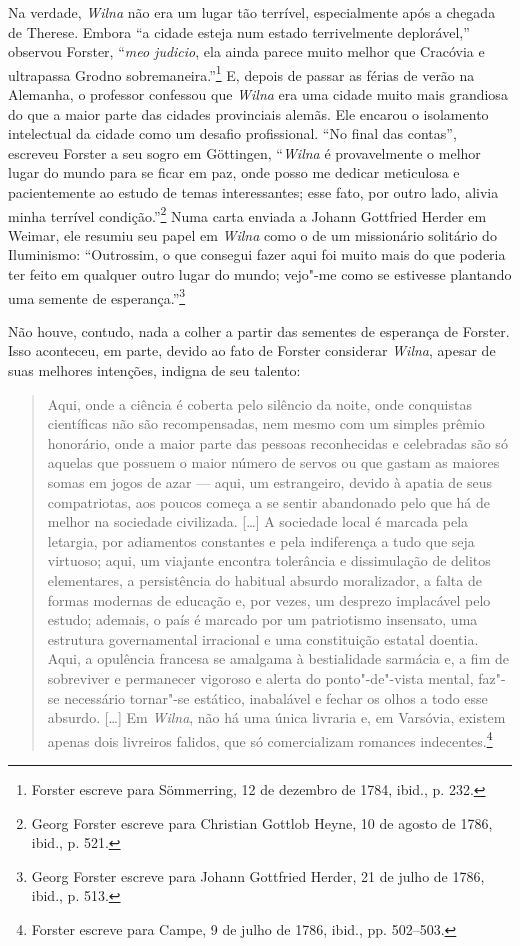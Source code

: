 Na verdade, \textit{Wilna} não era um lugar tão terrível, especialmente após a
chegada de Therese. Embora ``a cidade esteja num estado terrivelmente
deplorável,'' observou Forster, ``\textit{meo judicio}, ela ainda parece
muito melhor que Cracóvia e ultrapassa Grodno sobremaneira.''\footnote{Forster escreve para Sömmerring, 12 de dezembro de 1784, ibid., p. 232.} E, depois de passar as férias de verão na Alemanha, o professor confessou
que \textit{Wilna} era uma cidade muito mais grandiosa do que a maior parte das
cidades provinciais alemãs. Ele encarou o isolamento intelectual da
cidade como um desafio profissional. ``No final das contas'', escreveu
Forster a seu sogro em Göttingen, ``\textit{Wilna} é provavelmente o melhor lugar
do mundo para se ficar em paz, onde posso me dedicar meticulosa e
pacientemente ao estudo de temas interessantes; esse fato, por outro
lado, alivia minha terrível condição.''\footnote{Georg Forster escreve para Christian Gottlob Heyne, 10 de agosto de 1786, ibid., p. 521.} Numa carta enviada a Johann Gottfried Herder em Weimar, ele resumiu seu
papel em \textit{Wilna} como o de um missionário solitário do Iluminismo:
``Outrossim, o que consegui fazer aqui foi muito mais do que poderia ter
feito em qualquer outro lugar do mundo; vejo"-me como se estivesse
plantando uma semente de esperança.''\footnote{Georg Forster escreve para Johann Gottfried Herder, 21 de julho de 1786, ibid., p. 513.}

Não houve, contudo, nada a colher a partir das sementes de esperança de
Forster. Isso aconteceu, em parte, devido ao fato de Forster considerar
\textit{Wilna}, apesar de suas melhores intenções, indigna de seu talento:

\begin{quote}
Aqui, onde a ciência é coberta pelo silêncio da noite, onde conquistas
científicas não são recompensadas, nem mesmo com um simples prêmio
honorário, onde a maior parte das pessoas reconhecidas e celebradas são
só aquelas que possuem o maior número de servos ou que gastam as maiores
somas em jogos de azar --- aqui, um estrangeiro, devido à apatia de seus
compatriotas, aos poucos começa a se sentir abandonado pelo que há de
melhor na sociedade civilizada. [\ldots{}] A sociedade local é marcada
pela letargia, por adiamentos constantes e pela indiferença a tudo que
seja virtuoso; aqui, um viajante encontra tolerância e dissimulação de
delitos elementares, a persistência do habitual absurdo moralizador, a
falta de formas modernas de educação e, por vezes, um desprezo
implacável pelo estudo; ademais, o país é marcado por um patriotismo
insensato, uma estrutura governamental irracional e uma constituição
estatal doentia. Aqui, a opulência francesa se amalgama à bestialidade
sarmácia e, a fim de sobreviver e permanecer vigoroso e alerta do
ponto"-de"-vista mental, faz"-se necessário tornar"-se estático, inabalável
e fechar os olhos a todo esse absurdo. [\ldots{}] Em \textit{Wilna}, não há uma única
livraria e, em Varsóvia, existem apenas dois livreiros falidos, que só
comercializam romances indecentes.\footnote{Forster escreve para Campe, 9 de julho de 1786, ibid., pp. 502--503.} 
\end{quote}

